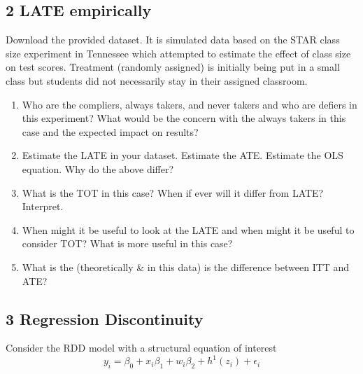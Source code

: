\documentclass[11pt]{article}
\begin{document}
\subsection*{2 LATE empirically}
Download the provided dataset. It is simulated data based on the STAR class size experiment in Tennessee which attempted to estimate the effect of class size on test scores. Treatment (randomly assigned) is initially being put in a small class but students did not necessarily stay in their assigned classroom.

\begin{enumerate}[label=\alph*)]
    \item Who are the compliers, always takers, and never takers and who are defiers in this experiment? What would be the concern with the always takers in this case and the expected impact on results?
    \item Estimate the LATE in your dataset. Estimate the ATE. Estimate the OLS equation. Why do the above differ?
    \item What is the TOT in this case? When if ever will it differ from LATE? Interpret.
    \item When might it be useful to look at the LATE and when might it be useful to consider TOT? What is more useful in this case?
    \item What is the (theoretically \& in this data) is the difference between ITT and ATE?
\end{enumerate}

\subsection*{3 Regression Discontinuity}
Consider the RDD model with a structural equation of interest
$$y_i = \beta_0  + x_i \beta_1 + w_i \beta_2 + h^1(z_i) + \epsilon_i$$
\end{document}
